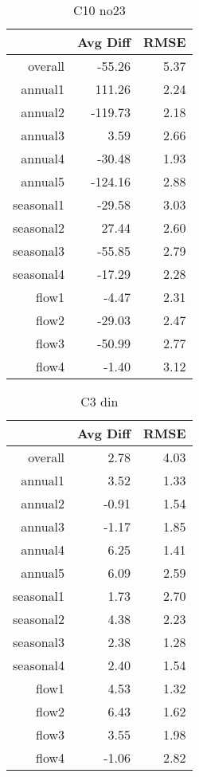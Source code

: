 \begin{table}[H]
\centering
\begin{tabular}{rrr}
  \hline
 & Avg Diff & RMSE \\ 
  \hline
overall & -55.26 & 5.37 \\ 
  annual1 & 111.26 & 2.24 \\ 
  annual2 & -119.73 & 2.18 \\ 
  annual3 & 3.59 & 2.66 \\ 
  annual4 & -30.48 & 1.93 \\ 
  annual5 & -124.16 & 2.88 \\ 
  seasonal1 & -29.58 & 3.03 \\ 
  seasonal2 & 27.44 & 2.60 \\ 
  seasonal3 & -55.85 & 2.79 \\ 
  seasonal4 & -17.29 & 2.28 \\ 
  flow1 & -4.47 & 2.31 \\ 
  flow2 & -29.03 & 2.47 \\ 
  flow3 & -50.99 & 2.77 \\ 
  flow4 & -1.40 & 3.12 \\ 
   \hline
\end{tabular}
\caption{C10 no23} 
\end{table}
\begin{table}[H]
\centering
\begin{tabular}{rrr}
  \hline
 & Avg Diff & RMSE \\ 
  \hline
overall & 2.78 & 4.03 \\ 
  annual1 & 3.52 & 1.33 \\ 
  annual2 & -0.91 & 1.54 \\ 
  annual3 & -1.17 & 1.85 \\ 
  annual4 & 6.25 & 1.41 \\ 
  annual5 & 6.09 & 2.59 \\ 
  seasonal1 & 1.73 & 2.70 \\ 
  seasonal2 & 4.38 & 2.23 \\ 
  seasonal3 & 2.38 & 1.28 \\ 
  seasonal4 & 2.40 & 1.54 \\ 
  flow1 & 4.53 & 1.32 \\ 
  flow2 & 6.43 & 1.62 \\ 
  flow3 & 3.55 & 1.98 \\ 
  flow4 & -1.06 & 2.82 \\ 
   \hline
\end{tabular}
\caption{C3 din} 
\end{table}
